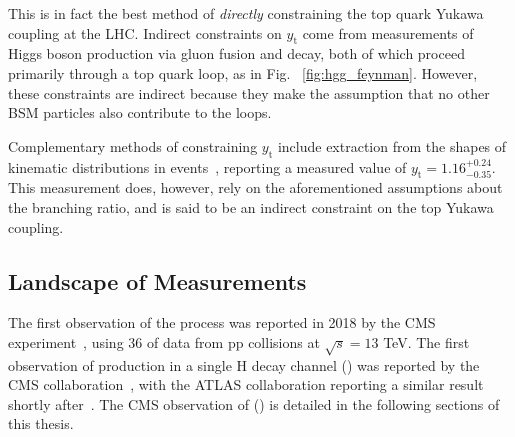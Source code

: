 This is in fact the best method of \emph{directly} constraining the top quark Yukawa coupling at the LHC.
Indirect constraints on $y_\text{t}$ come from measurements of Higgs boson production via gluon fusion and \Hgg decay, both of which proceed primarily through a top quark loop, as in Fig. ~\ref{fig:hgg_feynman}.
However, these constraints are indirect because they make the assumption that no other BSM particles also contribute to the loops. 

Complementary methods of constraining $y_\text{t}$ include extraction from the shapes of kinematic distributions in \ttb events~\cite{CMS:2020qzr}, reporting a measured value of $y_\text{t} = 1.16^{+0.24}_{-0.35}$.
This measurement does, however, rely on the aforementioned assumptions about the \Hgg branching ratio, and is said to be an indirect constraint on the top Yukawa coupling.

\subsection{Landscape of \ttH Measurements}
The first observation of the \ttH process was reported in 2018 by the CMS experiment~\cite{Sirunyan:2018hoz}, using 36 \fbinv of data from pp collisions at $\sqrt{s} = 13$ TeV.
The first observation of \ttH production in a single H decay channel (\Hgg) was reported by the CMS collaboration~\cite{tth_observation}, with the ATLAS collaboration reporting a similar result shortly after~\cite{Aad:2020ivc}.
The CMS observation of \ttH (\Hgg) is detailed in the following sections of this thesis.



